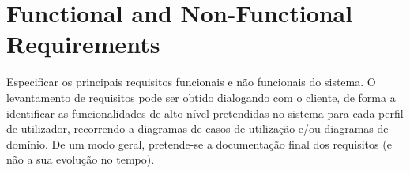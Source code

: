 \section{Functional and Non-Functional Requirements} %
\label{sec:requirements}

Especificar os principais requisitos funcionais e não funcionais do sistema. O levantamento de requisitos pode ser obtido dialogando com o cliente, de forma a identificar as funcionalidades de alto nível pretendidas no sistema para cada perfil de utilizador, recorrendo a diagramas de casos de utilização e/ou diagramas de domínio. De um modo geral, pretende-se a documentação final dos requisitos (e não a sua evolução no tempo).

